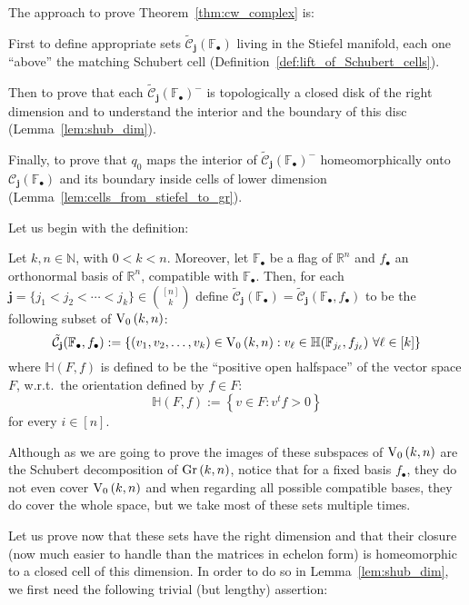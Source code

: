 The approach to prove Theorem~\ref{thm:cw_complex} is:
\begin{i_enum}
\item First to define appropriate sets $\tilde{\mathcal{C}}_{\mathbf{j}}(\mathbb{F}_{\bullet})$ living in the Stiefel manifold, each one ``above'' the matching Schubert cell (Definition~\ref{def:lift_of_Schubert_cells}).
\item Then to prove that each $\tilde{\mathcal{C}}_{\mathbf{j}}{\left(\mathbb{F}_{\bullet}\right)}^-$ is topologically a closed disk of the right dimension and to understand the interior and the boundary of this disc (Lemma~\ref{lem:shub_dim}).
\item Finally, to prove that $q_0$ maps the interior of $\tilde{\mathcal{C}}_{\mathbf{j}}(\mathbb{F}_{\bullet})^-$ homeomorphically onto $\mathcal{C}_{\mathbf{j}}(\mathbb{F}_{\bullet})$ and its boundary inside cells of lower dimension (Lemma~\ref{lem:cells_from_stiefel_to_gr}).
\end{i_enum}
Let us begin with the definition:

\begin{definition}\label{def:lift_of_Schubert_cells} Let $k,n\in\mathbb{N}$, with $0<k<n$. Moreover, let $\mathbb{F}_{\bullet}$ be a flag of $\mathbb{R}^n$ and $f_{\bullet}$ an orthonormal basis of $\mathbb{R}^n$, compatible with $\mathbb{F}_{\bullet}$. Then, for each $\mathbf{j}=\{j_1<j_2<\cdots<j_k\}\in\binom{[n]}{k}$ define $\tilde{\mathcal{C}}_{\mathbf{j}}(\mathbb{F}_{\bullet})=\tilde{\mathcal{C}}_{\mathbf{j}}(\mathbb{F}_{\bullet},f_{\bullet})$ to be the following subset of $\StO{k}{n}$:
\[\tilde{\mathcal{C}}_{\mathbf{j}}(\mathbb{F}_{\bullet},f_{\bullet}):=\left\{(v_1,v_2,\ldots,v_k)\in\StO{k}{n}:v_{\ell}\in\mathbb{H}(\mathbb{F}_{j_{\ell}},f_{j_{\ell}})\ \forall\ell\in[k]\right\}\]
where $\mathbb{H}(F,f)$ is defined to be the ``positive open halfspace'' of the vector space $F$, w.r.t.\ the orientation defined by $f\in F$:
\[\mathbb{H}(F,f):=\left\{v\in F:v^tf>0\right\}\]
for every $i\in[n]$.
\end{definition}

Although as we are going to prove the images of these subspaces of $\StO{k}{n}$ are the Schubert decomposition of $\Gr{k}{n}$, notice that for a fixed basis $f_{\bullet}$, they do not even cover $\StO{k}{n}$ and when regarding all possible compatible bases, they do cover the whole space, but we take most of these sets multiple times.

Let us prove now that these sets have the right dimension and that their closure (now much easier to handle than the matrices in echelon form) is homeomorphic to a closed cell of this dimension. In order to do so in Lemma~\ref{lem:shub_dim}, we first need the following trivial (but lengthy) assertion:

